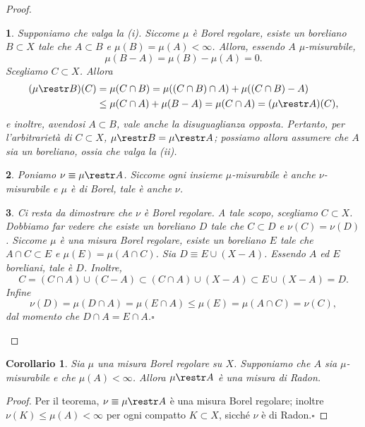 \documentclass[a4paper,10pt,openright,oneside]{book}
\theoremstyle{theoremstyle}
\newtheorem{corollario}[teorema]{Corollario}
\theoremstyle{theoremstylewoheader}
\theoremstyle{theoremstyle}
\theoremstyle{proofsecstyle}
\newtheorem{proofsec}{}
\theoremstyle{nonumberplain}
\newtheorem{proof}{Dim.}
\renewcommand{\qedsymbol}{\ensuremath{\square}}
\newcommand{\qed}{\unskip\nobreak\hfill\nobreak\hspace{.5em}\qedsymbol}
\begin{document}
\begin{proof}
\begin{proofsec}
Supponiamo che valga la (i). Siccome $\mu$ è Borel regolare, esiste un boreliano $B \subset X$ tale che $A \subset B$ e $\mu(B) = \mu(A) < \infty$. Allora, essendo $A$ $\mu$-misurabile,
\[
\mu(B - A) = \mu(B) - \mu(A) = 0.
\]
Scegliamo $C \subset X$. Allora
\begin{align*}
(\mu \restr B) (C) &= \mu(C \cap B) = \mu((C \cap B) \cap A) + \mu((C \cap B) - A)\\
&\le \mu(C \cap A) + \mu(B - A) = \mu(C \cap A) = (\mu \restr A) (C),
\end{align*}
e inoltre, avendosi $A \subset B$, vale anche la disuguaglianza opposta. Pertanto, per l'arbitrarietà di $C \subset X$, $\mu \restr B = \mu \restr A$; possiamo allora assumere che $A$ sia un boreliano, ossia che valga la (ii).
\end{proofsec}

\begin{proofsec}
Poniamo $\nu \equiv \mu \restr A$. Siccome ogni insieme $\mu$-misurabile è anche $\nu$-misurabile e $\mu$ è di Borel, tale è anche $\nu$.
\end{proofsec}

\begin{proofsec}
Ci resta da dimostrare che $\nu$ è Borel regolare. A tale scopo, scegliamo $C \subset X$. Dobbiamo far vedere che esiste un boreliano $D$ tale che $C \subset D$ e $\nu(C) = \nu(D)$. Siccome $\mu$ è una misura Borel regolare, esiste un boreliano $E$ tale che $A \cap C \subset E$ e $\mu(E) = \mu(A \cap C)$. Sia $D \equiv E \cup (X - A)$. Essendo $A$ ed $E$ boreliani, tale è $D$. Inoltre,
\[
C = (C \cap A) \cup (C - A) \subset (C \cap A) \cup (X - A) \subset E \cup (X - A) = D.
\]
Infine
\[
\nu(D) = \mu(D \cap A) = \mu(E \cap A) \le \mu(E) = \mu(A \cap C) = \nu(C),
\]
dal momento che $D \cap A = E \cap A$.\qed
\end{proofsec}
\end{proof}

\begin{corollario}
\label{cor:restrizione_misura_borel_regolare}
Sia $\mu$ una misura Borel regolare su $X$. Supponiamo che $A$ sia $\mu$-misurabile e che $\mu(A) < \infty$. Allora $\mu \restr A$ è una misura di Radon.
\end{corollario}

\begin{proof}
Per il teorema, $\nu \equiv \mu \restr A$ è una misura Borel regolare; inoltre $\nu(K) \le \mu(A) < \infty$ per ogni compatto $K \subset X$, sicché $\nu$ è di Radon.\qed
\end{proof}
\end{document}

